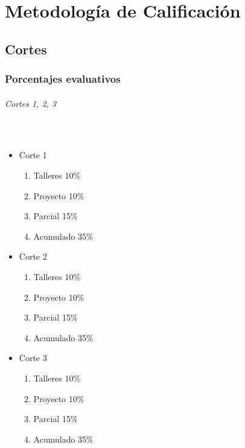 \documentclass[a4paper]{report} %
\begin{document}
    \part{}
    \part{}
    \part{}
    \part{Metodología de Calificación}
      \chapter{Cortes}
        \section{Porcentajes evaluativos}
          \paragraph{Cortes 1, 2, 3}\mbox{}\\
            \begin{itemize}
              \item Corte 1
              \begin{enumerate}
                \item Talleres 10\%
                \item Proyecto 10\%
                \item Parcial 15\%
                \item Acumulado 35\%
              \end{enumerate}
              \item Corte 2
              \begin{enumerate}
                 \item Talleres 10\%
                \item Proyecto 10\%
                \item Parcial 15\%
                \item Acumulado 35\%
              \end{enumerate}
              \item Corte 3
              \begin{enumerate}
                \item Talleres 10\%
                \item Proyecto 10\%
                \item Parcial 15\%
                \item Acumulado 35\%
              \end{enumerate}
            \end{itemize}
\end{document}
